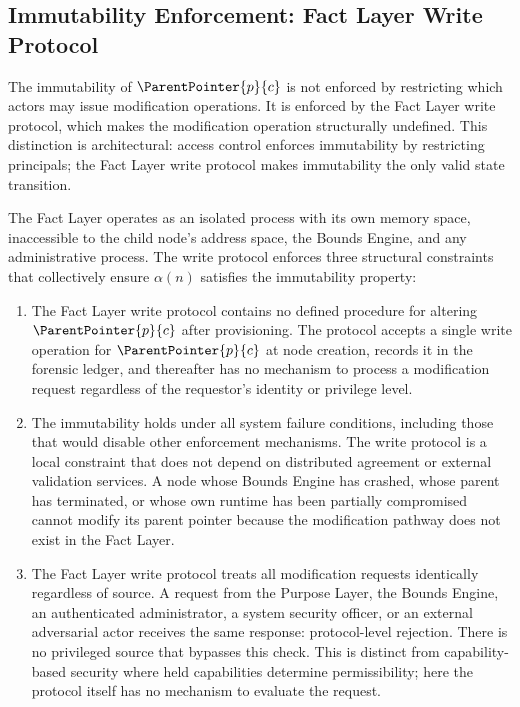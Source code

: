 \subsection{Immutability Enforcement: Fact Layer Write Protocol}
\label{sec:fact-layer-write-protocol}

The immutability of $\ParentPointer{p}{c}$ is not enforced by restricting which actors may issue modification operations. It is enforced by the Fact Layer write protocol, which makes the modification operation structurally undefined. This distinction is architectural: access control enforces immutability by restricting principals; the Fact Layer write protocol makes immutability the only valid state transition.

The Fact Layer operates as an isolated process with its own memory space, inaccessible to the child node's address space, the Bounds Engine, and any administrative process. The write protocol enforces three structural constraints that collectively ensure $\alpha(n)$ satisfies the immutability property:

\begin{enumerate}
    \item[(I1) \textbf{No modification operation defined.}] The Fact Layer write protocol contains no defined procedure for altering $\ParentPointer{p}{c}$ after provisioning. The protocol accepts a single write operation for $\ParentPointer{p}{c}$ at node creation, records it in the forensic ledger, and thereafter has no mechanism to process a modification request regardless of the requestor's identity or privilege level.

    \item[(I2) \textbf{Failure-state resilience.}] The immutability holds under all system failure conditions, including those that would disable other enforcement mechanisms. The write protocol is a local constraint that does not depend on distributed agreement or external validation services. A node whose Bounds Engine has crashed, whose parent has terminated, or whose own runtime has been partially compromised cannot modify its parent pointer because the modification pathway does not exist in the Fact Layer.

    \item[(I3) \textbf{Source-equivalence of rejection.}] The Fact Layer write protocol treats all modification requests identically regardless of source. A request from the Purpose Layer, the Bounds Engine, an authenticated administrator, a system security officer, or an external adversarial actor receives the same response: protocol-level rejection. There is no privileged source that bypasses this check. This is distinct from capability-based security where held capabilities determine permissibility; here the protocol itself has no mechanism to evaluate the request.
\end{enumerate}

